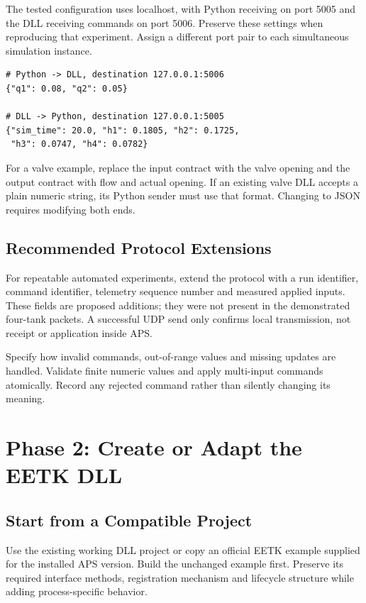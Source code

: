 \documentclass[11pt, letterpaper]{article}
\begin{document}
The tested configuration uses localhost, with Python receiving on port 5005 and the DLL receiving commands on port 5006. Preserve these settings when reproducing that experiment. Assign a different port pair to each simultaneous simulation instance.

\begin{lstlisting}[style=pythonstyle,caption={Existing four-tank message format: UTF-8 JSON}]
# Python -> DLL, destination 127.0.0.1:5006
{"q1": 0.08, "q2": 0.05}

# DLL -> Python, destination 127.0.0.1:5005
{"sim_time": 20.0, "h1": 0.1805, "h2": 0.1725,
 "h3": 0.0747, "h4": 0.0782}
\end{lstlisting}

For a valve example, replace the input contract with the valve opening and the output contract with flow and actual opening. If an existing valve DLL accepts a plain numeric string, its Python sender must use that format. Changing to JSON requires modifying both ends.

\subsection{Recommended Protocol Extensions}
For repeatable automated experiments, extend the protocol with a run identifier, command identifier, telemetry sequence number and measured applied inputs. These fields are proposed additions; they were not present in the demonstrated four-tank packets. A successful UDP send only confirms local transmission, not receipt or application inside APS.

Specify how invalid commands, out-of-range values and missing updates are handled. Validate finite numeric values and apply multi-input commands atomically. Record any rejected command rather than silently changing its meaning.

\section{Phase 2: Create or Adapt the EETK DLL}
\subsection{Start from a Compatible Project}
Use the existing working DLL project or copy an official EETK example supplied for the installed APS version. Build the unchanged example first. Preserve its required interface methods, registration mechanism and lifecycle structure while adding process-specific behavior.
\end{document}
